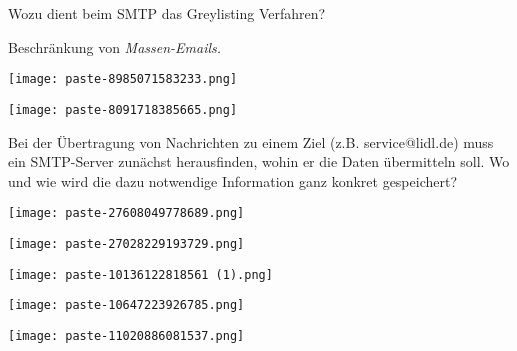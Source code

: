 \documentclass{article}
\begin{document}
\begin{tcolorbox}[colback=white!10!white,colframe=lightgray!75!black,
  savelowerto=\jobname_ex.tex,breakable,enhanced,lines before break=40]

\justifying
Wozu dient beim SMTP das Greylisting Verfahren?

\tcblower

\justifying
Beschränkung von \textit{Massen-Emails.}\begin{center}
\texttt{[image: paste-8985071583233.png]}
\end{center}
\begin{center}
\texttt{[image: paste-8091718385665.png]}
\end{center}

\end{tcolorbox}
\begin{tcolorbox}[colback=white!10!white,colframe=lightgray!75!black,
  savelowerto=\jobname_ex.tex,breakable,enhanced,lines before break=40]

\justifying
Bei der Übertragung von Nachrichten zu einem Ziel (z.B. service@lidl.de) muss ein SMTP-Server zunächst herausfinden, wohin er die Daten übermitteln soll. Wo und wie wird die dazu notwendige Information ganz konkret gespeichert?

\tcblower

\justifying
\begin{center}
\texttt{[image: paste-27608049778689.png]}
\end{center}
\begin{center}
\texttt{[image: paste-27028229193729.png]}
\end{center}
\begin{center}
\texttt{[image: paste-10136122818561 (1).png]}
\end{center}

\end{tcolorbox}
\begin{tcolorbox}[colback=white!10!white,colframe=lightgray!75!black,
  savelowerto=\jobname_ex.tex,breakable,enhanced,lines before break=40]

\justifying
\begin{center}
\texttt{[image: paste-10647223926785.png]}
\end{center}


\tcblower

\justifying
\begin{center}
\texttt{[image: paste-11020886081537.png]}
\end{center}

\end{tcolorbox}
\end{document}
